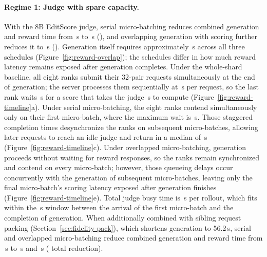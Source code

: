 \paragraph{Regime 1: Judge with spare capacity.}
With the 8B EditScore judge, serial micro-batching reduces combined generation and reward time from \RSSmallBase{}\,s to \RSSmallSerial{}\,s (\RSSmallSerialSaving{}), and overlapping generation with scoring further reduces it to \RSSmallOverlap{}\,s (\RSSmallOverlapSaving{}).
Generation itself requires approximately \RSGenEstimate{}\,s across all three schedules (Figure~\ref{fig:reward-overlap}); the schedules differ in how much reward latency remains exposed after generation completes.
Under the whole-shard baseline, all eight ranks submit their 32-pair requests simultaneously at the end of generation; the server processes them sequentially at \RSSmallWholeService{}\,s per request, so the last rank waits \RSSmallWholeWaitMax{}\,s for a score that takes the judge \RSSmallWholeService{}\,s to compute (Figure~\ref{fig:reward-timeline}a).
Under serial micro-batching, the eight ranks contend simultaneously only on their first micro-batch, where the maximum wait is \RSSmallSerialFirstWaitMax{}\,s.
Those staggered completion times desynchronize the ranks on subsequent micro-batches, allowing later requests to reach an idle judge and return in a median of \RSSmallSerialLaterWait{}\,s (Figure~\ref{fig:reward-timeline}c).
Under overlapped micro-batching, generation proceeds without waiting for reward responses, so the ranks remain synchronized and contend on every micro-batch; however, those queueing delays occur concurrently with the generation of subsequent micro-batches, leaving only the final micro-batch's scoring latency exposed after generation finishes (Figure~\ref{fig:reward-timeline}e).
Total judge busy time is \RSSmallOverlapWork{}\,s per rollout, which fits within the \RSSmallOverlapWindow{}\,s window between the arrival of the first micro-batch and the completion of generation.
When additionally combined with sibling request packing (Section~\ref{sec:fidelity-pack}), which shortens generation to 56.2\,s, serial and overlapped micro-batching reduce combined generation and reward time from \RSSmallPackedBase{}\,s to \RSSmallPackedSerial{}\,s and \RSSmallPackedOverlap{}\,s (\RSSmallPackedSaving{} total reduction).

